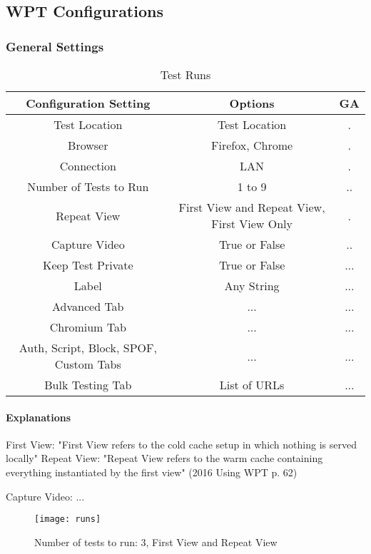 \subsection{WPT Configurations}


\subsubsection{General Settings}

\begin{table}[h]
	\caption[Test Runs]{Test Runs \cite{DBLP:books/infix/Schwarz99}}
	\label{tab:tamodelleVergleich}
	\centering
	\begin{tabular}{ c | c | c } 
	Configuration Setting & Options & GA \\
	\hline \hline
	Test Location & Test Location & . \\ 
	Browser & Firefox, Chrome & . \\
	\hline
	Connection & LAN & . \\
	Number of Tests to Run & 1 to 9 & .. \\
	Repeat View & First View and Repeat View, First View Only & . \\
	Capture Video & True or False & .. \\
	Keep Test Private & True or False & ... \\
	Label & Any String & ... \\
	\hline	  
	Advanced Tab & ... & ... \\
	Chromium Tab & ... & ... \\
	Auth, Script, Block, SPOF, Custom Tabs & ... & ... \\
	Bulk Testing Tab & List of URLs & ... \\
	\end{tabular}
\end{table}

\paragraph{Explanations}

First View: "First View refers to the cold cache setup in which nothing is served locally"
Repeat View: "Repeat View refers to the warm cache containing everything instantiated by the first view"
(2016 Using WPT p. 62)

Capture Video: ...

\begin{figure}[h!]
  \caption{Number of tests to run: 3, First View and Repeat View}
  \texttt{[image: runs]}
\end{figure}

